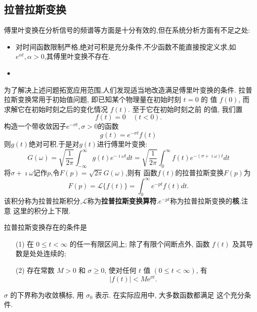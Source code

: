 \subsection{拉普拉斯变换}
\label{subsec:laplace_transform}

傅里叶变换在分析信号的频谱等方面是十分有效的,但在系统分析方面有不足之处:

\begin{itemize}
    \item 对时间函数限制严格,绝对可积是充分条件,不少函数不能直接按定义求,如$e^{\alpha t}, \alpha > 0$,其傅里叶变换不存在.

    \item  
\end{itemize}
为了解决上述问题拓宽应用范围,人们发现适当地改造满足傅里叶变换的条件.
拉普拉斯变换常用于初始值问题, 即已知某个物理量在初始时刻 $t=0$ 的 值 $f(0)$, 而求解它在初始时刻之后的变化情况 $f(t)$.
 至于它在初始时刻之前 的值, 我们置
$$
f(t)=0 \quad(t<0) .
$$
构造一个带收敛因子$e^{-\sigma t}, \sigma > 0$的函数
$$
g(t) =e^{-\sigma t} f(t)
$$
则$g(t)$绝对可积.于是对$g(t)$进行傅里叶变换:
\begin{equation}
    G(\omega) = \sqrt{\frac{1}{2\pi} } \int_{-\infty}^{\infty} g(t) e^{-\imath \omega t} dt 
    = \sqrt{\frac{1}{2\pi} } \int_{0}^{\infty} f(t) e^{-(\sigma + \imath \omega) t} dt  
\end{equation}
将$\sigma + \imath \omega$记作$p$,令$F(p)=\sqrt{2\pi}G(\omega)$,则有
函数$f(t)$的拉普拉斯变换$F(p)$为
\begin{equation}
    F(p) = \mathcal{L} \{ f(t) \} = \int_0 ^{\infty} e^{-pt} f(t) dt .
\end{equation}
该积分称为拉普拉斯积分,$\mathcal{L}$称为\textbf{拉普拉斯变换算符}.$e^{-pt}$称为拉普拉斯变换的\textbf{核}.注意
这里的积分上下限.

拉普拉斯变换存在的条件是 
\begin{enumerate}
    \item[(1)]  在 $0 \leqslant t<\infty$ 的任一有限区间上; 除了有限个间断点外, 函数 $f(t)$ 及其导数是处处连续的;
    \item[(2)]  存在常数 $M>0$ 和 $\sigma \geqslant 0$, 使对任何 $t$ 值 $(0 \leqslant t<\infty)$, 有
    $$
    |f(t)|<M \mathrm{e}^{\sigma t} \text {. }
    $$
\end{enumerate}
$\sigma$ 的下界称为收敛横标, 用 $\sigma_0$ 表示. 在实际应用中, 大多数函数都满足 这个充分条件.

